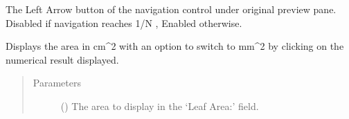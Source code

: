 \documentclass[letterpaper,10pt,english]{sphinxmanual}
\begin{document}
\begin{fulllineitems}
\begin{fulllineitems}
\begin{quote}
\begin{description}
\end{description}\end{quote}

\end{fulllineitems}


\begin{fulllineitems}
\label{\detokenize{pyleaf.leaf_area_calculator_gui:pyleaf.leaf_area_calculator_gui.LeafAreaCalculatorGUI.display_left}}
The Left Arrow button of the navigation control under original preview pane.
Disabled if navigation reaches 1/N , Enabled otherwise.

\end{fulllineitems}


\begin{fulllineitems}
\label{\detokenize{pyleaf.leaf_area_calculator_gui:pyleaf.leaf_area_calculator_gui.LeafAreaCalculatorGUI.display_result}}
Displays the area in cm\textasciicircum{}2 with an option to switch to mm\textasciicircum{}2 by clicking on the numerical result displayed.
\begin{quote}\begin{description}
\item[{Parameters}] \leavevmode
{} (\sphinxstyleliteralemphasis{\sphinxupquote{, }}) \textendash{} The area to display in the ‘Leaf Area:’  field.

\end{description}\end{quote}

\end{fulllineitems}



\end{fulllineitems}
\end{document}

